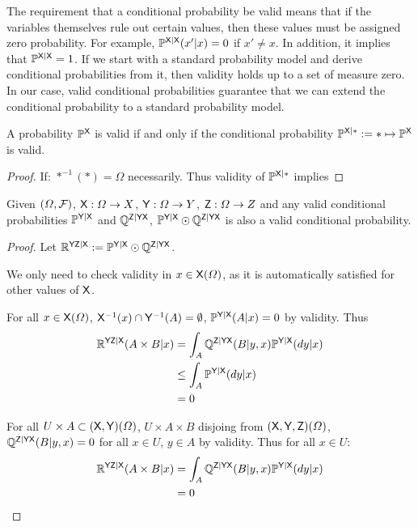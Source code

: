 The requirement that a conditional probability be valid means that if the variables themselves rule out certain values, then these values must be assigned zero probability. For example, $\mathbb{P}^{\mathsf{X}|\mathsf{X}}(x'|x)=0$ if $x'\neq x$. In addition, it implies that $\mathbb{P}^{\mathsf{X}|\mathsf{X}}=1$. If we start with a standard probability model and derive conditional probabilities from it, then validity holds up to a set of measure zero. In our case, valid conditional probabilities guarantee that we can extend the conditional probability to a standard probability model.

\begin{lemma}
A probability $\mathbb{P}^{\mathsf{X}}$ is valid if and only if the conditional probability $\mathbb{P}^{\mathsf{X}|*}:=*\mapsto \mathbb{P}^{\mathsf{X}}$ is valid.
\end{lemma}

\begin{proof}
If: $*^{-1}(*)=\Omega$ necessarily. Thus validity of $\mathbb{P}^{\mathsf{X}|*}$ implies 
\end{proof}

\begin{lemma}\label{lem:valid_extendability}
Given $(\Omega,\mathcal{F})$, $\mathsf{X}:\Omega\to X$, $\mathsf{Y}:\Omega\to Y$, $\mathsf{Z}:\Omega\to Z$ and any valid conditional probabilities $\mathbb{P}^{\mathsf{Y}|\mathsf{X}}$ and $\mathbb{Q}^{\mathsf{Z}|\mathsf{Y}\mathsf{X}}$, $ \mathbb{P}^{\mathsf{Y}|\mathsf{X}}\odot \mathbb{Q}^{\mathsf{Z}|\mathsf{Y}\mathsf{X}}$ is also a valid conditional probability.
\end{lemma}

\begin{proof}
Let $\mathbb{R}^{\mathsf{YZ}|\mathsf{X}}:=\mathbb{P}^{\mathsf{Y}|\mathsf{X}}\odot \mathbb{Q}^{\mathsf{Z}|\mathsf{Y}\mathsf{X}}$.

We only need to check validity in $x\in \mathsf{X}(\Omega)$, as it is automatically satisfied for other values of $\mathsf{X}$.

For all $x\in \mathsf{X}(\Omega)$, $\mathsf{X}^{-1}(x)\cap\mathsf{Y}^{-1}(A)=\emptyset$, $\mathbb{P}^{\mathsf{Y}|\mathsf{X}}(A|x)=0$ by validity. Thus
\begin{align}
	\mathbb{R}^{\mathsf{YZ}|\mathsf{X}}(A\times B|x) &= \int_A\mathbb{Q}^{\mathsf{Z}|\mathsf{YX}}(B|y,x)\mathbb{P}^{\mathsf{Y}|\mathsf{X}}(dy|x)\\
								  &\leq \int_A\mathbb{P}^{\mathsf{Y}|\mathsf{X}}(dy|x)\\
								  &=0
\end{align}

For all $U\times A\subset (\mathsf{X},\mathsf{Y})(\Omega)$, $U\times A\times B$ disjoing from $(\mathsf{X},\mathsf{Y},\mathsf{Z})(\Omega)$, $\mathbb{Q}^{\mathsf{Z}|\mathsf{YX}}(B|y,x)=0$ for all $x\in U$, $y\in A$ by validity. Thus for all $x\in U$:
\begin{align}
	\mathbb{R}^{\mathsf{YZ}|\mathsf{X}}(A\times B|x) &= \int_A\mathbb{Q}^{\mathsf{Z}|\mathsf{YX}}(B|y,x)\mathbb{P}^{\mathsf{Y}|\mathsf{X}}(dy|x)\\
								  &=0
\end{align}
\end{proof}

